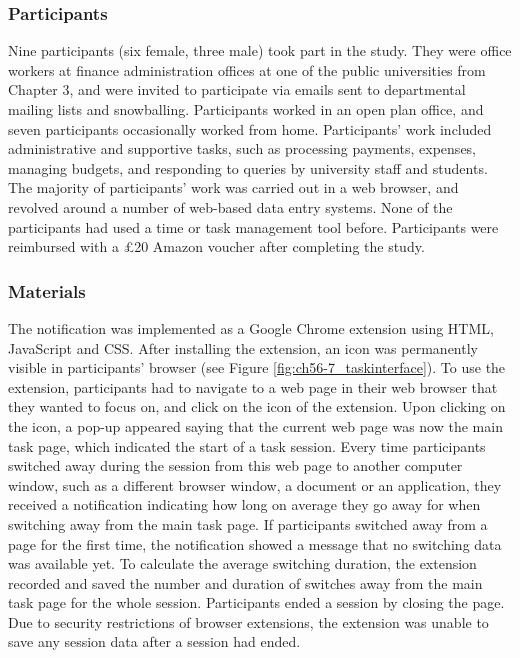 \subsubsection{Participants}
Nine participants (six female, three male) took part in the study. They were office workers at finance administration offices at one of the public universities from Chapter 3, and were invited to participate via emails sent to departmental mailing lists and snowballing. Participants worked in an open plan office, and seven participants occasionally worked from home. Participants’ work included administrative and supportive tasks, such as processing payments, expenses, managing budgets, and responding to queries by university staff and students. The majority of participants' work was carried out in a web browser, and revolved around a number of web-based data entry systems. None of the participants had used a time or task management tool before. Participants were reimbursed with a  \pounds 20 Amazon voucher after completing the study. 


\subsubsection{Materials}
The notification was implemented as a Google Chrome extension using HTML, JavaScript and CSS. After installing the extension, an icon was permanently visible in participants’ browser (see Figure \ref{fig:ch56-7_taskinterface}). To use the extension, participants had to navigate to a web page in their web browser that they wanted to focus on, and click on the icon of the extension. Upon clicking on the icon, a pop-up appeared saying that the current web page was now the main task page, which indicated the start of a task session. Every time participants switched away during the session from this web page to another computer window, such as a different browser window, a document or an application, they received a notification indicating how long on average they go away for when switching away from the main task page. If participants switched away from a page for the first time, the notification showed a message that no switching data was available yet. To calculate the average switching duration, the extension recorded and saved the number and duration of switches away from the main task page for the whole session. Participants ended a session by closing the page. Due to security restrictions of browser extensions, the extension was unable to save any session data after a session had ended. 

